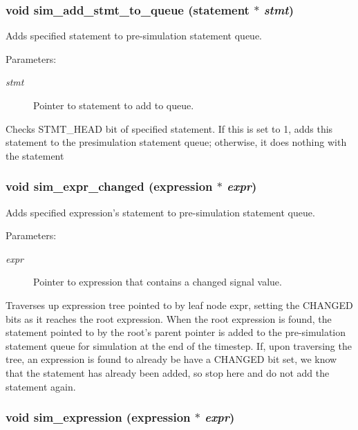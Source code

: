 \subsubsection{\setlength{\rightskip}{0pt plus 5cm}void sim\_\-add\_\-stmt\_\-to\_\-queue ({\bf statement} $\ast$ {\em stmt})}\label{sim_8c_a6}


Adds specified statement to pre-simulation statement queue. 

\begin{Desc}
\item[Parameters:]
\begin{description}
\item[{\em stmt}]Pointer to statement to add to queue.\end{description}
\end{Desc}
Checks STMT\_\-HEAD bit of specified statement. If this is set to 1, adds this statement to the presimulation statement queue; otherwise, it does nothing with the statement 
\subsubsection{\setlength{\rightskip}{0pt plus 5cm}void sim\_\-expr\_\-changed ({\bf expression} $\ast$ {\em expr})}\label{sim_8c_a5}


Adds specified expression's statement to pre-simulation statement queue. 

\begin{Desc}
\item[Parameters:]
\begin{description}
\item[{\em expr}]Pointer to expression that contains a changed signal value.\end{description}
\end{Desc}
Traverses up expression tree pointed to by leaf node expr, setting the CHANGED bits as it reaches the root expression. When the root expression is found, the statement pointed to by the root's parent pointer is added to the pre-simulation statement queue for simulation at the end of the timestep. If, upon traversing the tree, an expression is found to already be have a CHANGED bit set, we know that the statement has already been added, so stop here and do not add the statement again. 
\subsubsection{\setlength{\rightskip}{0pt plus 5cm}void sim\_\-expression ({\bf expression} $\ast$ {\em expr})}\label{sim_8c_a8}


